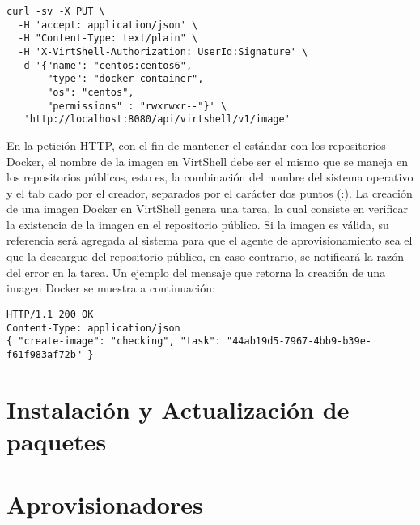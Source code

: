 \vspace{5mm}

\begin{lstlisting}[style=json, caption=Petición HTTP para crear una imagen para contenedores Docker]
curl -sv -X PUT \
  -H 'accept: application/json' \
  -H "Content-Type: text/plain" \
  -H 'X-VirtShell-Authorization: UserId:Signature' \
  -d '{"name": "centos:centos6",
       "type": "docker-container",
       "os": "centos",
       "permissions" : "rwxrwxr--"}' \
   'http://localhost:8080/api/virtshell/v1/image'
\end{lstlisting}

\vspace{5mm}

En la petición HTTP, con el fin de mantener el estándar con los repositorios Docker, el nombre de la imagen en VirtShell debe ser el mismo que se maneja en los repositorios públicos, esto es, la combinación del nombre del sistema operativo y el tab dado por el creador, separados por el carácter dos puntos (:). La creación de una imagen Docker en VirtShell genera una tarea, la cual consiste en verificar la existencia de la imagen en el repositorio público. Si la imagen es válida, su referencia será agregada al sistema para que el agente de aprovisionamiento sea el que la descargue del repositorio público, en caso contrario, se notificará la razón del error en la tarea. Un ejemplo del mensaje que retorna la creación de una imagen Docker se muestra a continuación:

\vspace{5mm}

\begin{lstlisting}[style=json, caption=Ejemplo de respuesta HTTP para la creación de una imagen]
HTTP/1.1 200 OK
Content-Type: application/json
{ "create-image": "checking", "task": "44ab19d5-7967-4bb9-b39e-f61f983af72b" }
\end{lstlisting}





\section{Instalación y Actualización de paquetes}


\section{Aprovisionadores}





